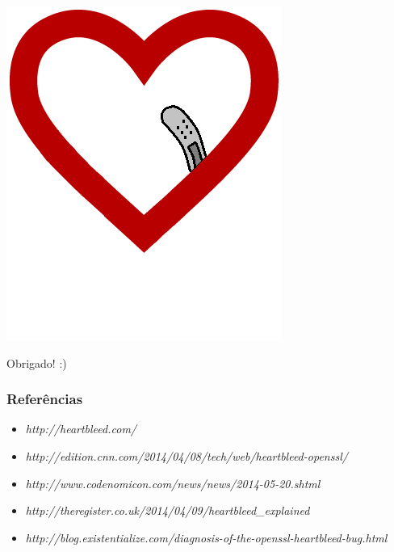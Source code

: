 \documentclass{beamer}
\begin{document}
\begin{frame}
\begin{center}
	\includegraphics[scale=0.4]{heartcured.png}
	\begin{center} 
		Obrigado! :)
	\end{center}
\end{center}
\end{frame}

\begin{frame}
	\frametitle{Referências}
	\begin{itemize}
		\item \textit{http://heartbleed.com/}
		\item \textit{http://edition.cnn.com/2014/04/08/tech/web/heartbleed-openssl/}
		\item \textit{http://www.codenomicon.com/news/news/2014-05-20.shtml}
		\item \textit{http://theregister.co.uk/2014/04/09/heartbleed\_explained}
		\item \textit{http://blog.existentialize.com/diagnosis-of-the-openssl-heartbleed-bug.html}
	\end{itemize}
\end{frame}
\end{document}
